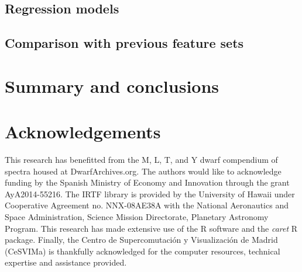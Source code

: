 \documentclass[a4paper,fleqn,usenatbib]{mnras}
\begin{document}
\subsection{Regression models}

\subsection{Comparison with previous feature sets}


\section{Summary and conclusions}
\label{sec:summary}


\section*{Acknowledgements}
This research has benefitted from the M, L, T, and Y dwarf compendium
of spectra housed at DwarfArchives.org.  The authors would like to
acknowledge funding by the Spanish Ministry of Economy and Innovation
through the grant AyA2014-55216. The IRTF library is provided by the
University of Hawaii under Cooperative Agreement no. NNX-08AE38A with
the National Aeronautics and Space Administration, Science Mission
Directorate, Planetary Astronomy Program. This research has made
extensive use of the R software \cite{R} and the {\it caret} R
package. Finally, the Centro de Supercomutaci\'on y Visualizaci\'on 
de Madrid (CeSVIMa) is thankfully acknowledged for the computer
resources, technical expertise and assistance provided.


{}


\begin{appendix}
\label{app}



\end{appendix}
\end{document}
